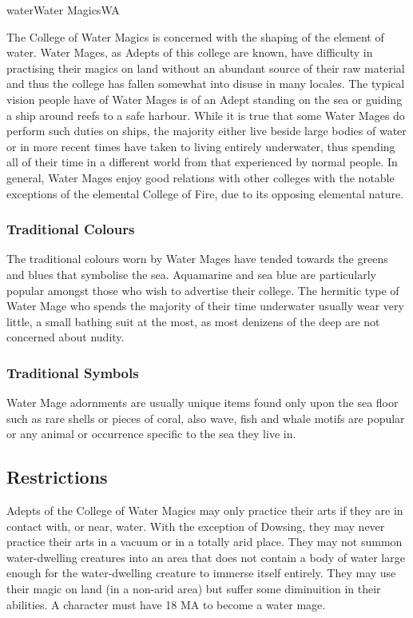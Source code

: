 \begin{college}[1.3]{water}{Water Magics}{WA}

The College of Water Magics is concerned with the shaping of the
element of water. Water Mages, as Adepts of this college are known,
have difficulty in practising their magics on land without an abundant
source of their raw material and thus the college has fallen somewhat
into disuse in many locales. The typical vision people have of Water
Mages is of an Adept standing on the sea or guiding a ship around
reefs to a safe harbour. While it is true that some Water Mages do
perform such duties on ships, the majority either live beside large
bodies of water or in more recent times have taken to living entirely
underwater, thus spending all of their time in a different world from
that experienced by normal people. In general, Water Mages enjoy good
relations with other colleges with the notable exceptions of the
elemental College of Fire, due to its opposing elemental nature.

\subsubsection{Traditional Colours}

The traditional colours worn by Water Mages have tended towards the
greens and blues that symbolise the sea. Aquamarine and sea blue are
particularly popular amongst those who wish to advertise their
college. The hermitic type of Water Mage who spends the majority of
their time underwater usually wear very little, a small bathing suit
at the most, as most denizens of the deep are not concerned about
nudity.

\subsubsection{Traditional Symbols}

Water Mage adornments are usually unique items found only upon the sea
floor such as rare shells or pieces of coral, also wave, fish and
whale motifs are popular or any animal or occurrence specific to the
sea they live in.

\subsection{Restrictions}

Adepts of the College of Water Magics may only practice their arts if
they are in contact with, or near, water. With the exception of
Dowsing, they may never practice their arts in a vacuum or in a
totally arid place. They may not summon water-dwelling creatures into
an area that does not contain a body of water large enough for the
water-dwelling creature to immerse itself entirely. They may use their
magic on land (in a non-arid area) but suffer some diminuition in their
abilities. A character must have 18 MA to become a water mage.


\end{college}
